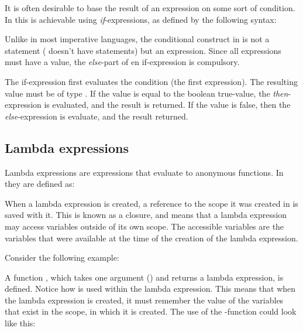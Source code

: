 It is often desirable to base the result of an expression on some sort of condition.
In \productname{} this is achievable using \emph{if}-expressions, as defined by the
following syntax:

\begin{ebnf}
\end{ebnf}

Unlike in most imperative languages, the conditional construct in \productname{}
is not a statement (\productname{} doesn't have statements) but an expression.
Since all expressions must have a value, the \emph{else}-part of en
if-expression is compulsory.

The if-expression first evaluates the condition (the first expression). The
resulting value must be of type . If the value is equal to the
boolean true-value, the \emph{then}-expression is evaluated, and the result is
returned. If the value is false, then the \emph{else}-expression is evaluate,
and the result returned.

\subsection{Lambda expressions}

Lambda expressions are expressions that evaluate to anonymous functions. In
\productname{} they are defined as:

\begin{ebnf}
\end{ebnf}

When a lambda expression is created, a reference to the scope it was created in
is saved with it. This is known as a closure, and means that a lambda
expression may access variables outside of its own scope. The accessible
variables are the variables that were available at the time of the creation of
the lambda expression.

Consider the following example:


A function , which takes one argument () and
returns a lambda expression, is defined. Notice how  is used within
the lambda expression. This means that when the lambda expression is created, it
must remember the value of the variables that exist in the scope, in which it is
created. The use of the -function could look like this:


